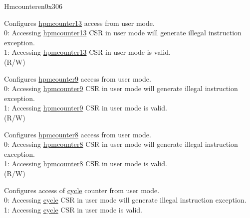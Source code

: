 \begin{register}{H}{mcounteren}{0x306}\label{regdesc:MCOUNTEREN}
%
%
%
%
%
%
%
%
%
\regnewline%
\begin{regdesc}\begin{reglist}
\label{fielddesc:MCOUNTEREN_HPM_13}\item [{HPM13}] Configures
\hyperref[regdesc:HPMCOUNTER13] {hpmcounter13} access from user mode.\\
0: Accessing \hyperref[regdesc:HPMCOUNTER13] {hpmcounter13} CSR in user mode will generate illegal instruction exception. \\
1: Accessing \hyperref[regdesc:HPMCOUNTER13] {hpmcounter13} CSR in user mode is valid. \\
(R/W)
\label{fielddesc:MCOUNTEREN_HPM9}\item [{HPM9}] Configures \hyperref[regdesc:HPMCOUNTER9] {hpmcounter9} access from user mode.\\
0: Accessing \hyperref[regdesc:HPMCOUNTER9] {hpmcounter9} CSR in user mode will generate illegal instruction exception. \\
1: Accessing \hyperref[regdesc:HPMCOUNTER9] {hpmcounter9} CSR in user mode is valid. \\
(R/W)
\label{fielddesc:MCOUNTEREN_HPM_8}\item [{HPM8}] Configures \hyperref[regdesc:HPMCOUNTER8] {hpmcounter8} access from user mode.\\
0: Accessing \hyperref[regdesc:HPMCOUNTER8] {hpmcounter8} CSR in user mode will generate illegal instruction exception. \\
1: Accessing \hyperref[regdesc:HPMCOUNTER8] {hpmcounter8} CSR in user mode is valid. \\
(R/W)
\label{fielddesc:MCOUNTEREN_CY}\item [CY] Configures access of \hyperref[regdesc:CYCLE]{cycle} counter from user mode. \\
0: Accessing \hyperref[regdesc:CYCLE]{cycle} CSR in user mode will generate illegal instruction exception. \\
1: Accessing \hyperref[regdesc:CYCLE]{cycle} CSR in user mode is valid. \\

\end{reglist}
\end{regdesc}
\end{register}
